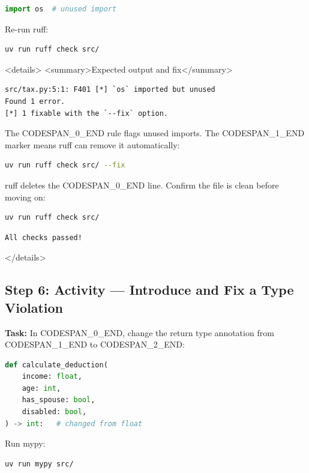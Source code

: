 \documentclass[11pt,a4paper]{book}
\begin{document}
\begin{lstlisting}[language=Python]
import os  # unused import
\end{lstlisting}

Re-run ruff:

\begin{lstlisting}[language=Bash]
uv run ruff check src/
\end{lstlisting}

<details>
<summary>Expected output and fix</summary>

\begin{lstlisting}
src/tax.py:5:1: F401 [*] `os` imported but unused
Found 1 error.
[*] 1 fixable with the `--fix` option.
\end{lstlisting}

The CODESPAN\_0\_END rule flags unused imports. The CODESPAN\_1\_END marker means ruff can remove it automatically:

\begin{lstlisting}[language=Bash]
uv run ruff check src/ --fix
\end{lstlisting}

ruff deletes the CODESPAN\_0\_END line. Confirm the file is clean before moving on:

\begin{lstlisting}[language=Bash]
uv run ruff check src/
\end{lstlisting}

\begin{lstlisting}
All checks passed!
\end{lstlisting}

</details>

\medskip

\subsection{Step 6: Activity --- Introduce and Fix a Type Violation}

\textbf{Task:} In CODESPAN\_0\_END, change the return type annotation from CODESPAN\_1\_END to CODESPAN\_2\_END:

\begin{lstlisting}[language=Python]
def calculate_deduction(
    income: float,
    age: int,
    has_spouse: bool,
    disabled: bool,
) -> int:   # changed from float
\end{lstlisting}

Run mypy:

\begin{lstlisting}[language=Bash]
uv run mypy src/
\end{lstlisting}
\end{document}
